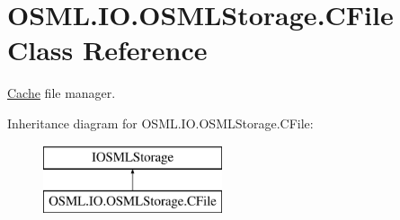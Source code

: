 \hypertarget{classOSML_1_1IO_1_1OSMLStorage_1_1CFile}{}\section{O\+S\+M\+L.\+I\+O.\+O\+S\+M\+L\+Storage.\+C\+File Class Reference}
\label{classOSML_1_1IO_1_1OSMLStorage_1_1CFile}


\mbox{\hyperlink{namespaceOSML_1_1Cache}{Cache}} file manager.  


Inheritance diagram for O\+S\+M\+L.\+I\+O.\+O\+S\+M\+L\+Storage.\+C\+File\+:\begin{figure}[H]
\begin{center}
\leavevmode
\includegraphics[height=2.000000cm]{classOSML_1_1IO_1_1OSMLStorage_1_1CFile}
\end{center}
\end{figure}
